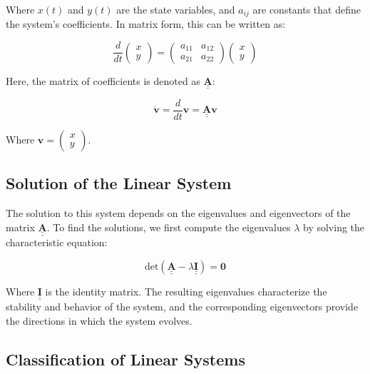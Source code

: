 \documentclass{amsbook}
\begin{document}
Where \(x(t)\) and \(y(t)\) are the state variables, and \(a_{ij}\) are constants that define the system's coefficients. In matrix form, this can be written as:

\[
\frac{d}{dt} \begin{pmatrix} x \\ y \end{pmatrix} = \begin{pmatrix} a_{11} & a_{12} \\ a_{21} & a_{22} \end{pmatrix} \begin{pmatrix} x \\ y \end{pmatrix}
\]

Here, the matrix of coefficients is denoted as \(\underline{\underline{\mathbf{A}}}\):

\[
\dot{\mathbf{v}} =\frac{d}{dt} \mathbf{v} = \underline{\underline{\mathbf{A}}} \mathbf{v}
\]

Where \({\mathbf{v}} = \begin{pmatrix} x \\ y \end{pmatrix}\).

\subsection{Solution of the Linear System}

The solution to this system depends on the eigenvalues and eigenvectors of the matrix \(\underline{\underline{\mathbf{A}}}\). To find the solutions, we first compute the eigenvalues \(\lambda\) by solving the characteristic equation:

\begin{equation}
    \text{det}(\underline{\underline{\mathbf{A}}} - \lambda \underline{\underline{\mathbf{I}}}) = \mathbf{0}
    \label{eq:LinearSysCharacteristicEquation}
\end{equation}

Where \(\underline{\underline{\mathbf{I}}}\) is the identity matrix. The resulting eigenvalues characterize the stability and behavior of the system, and the corresponding eigenvectors provide the directions in which the system evolves.

\subsection{Classification of Linear Systems}
\end{document}
